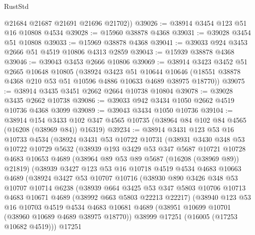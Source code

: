\begin{lexlean}{RustStd}
\begin{coremodule}
        @21684
        @21687
        @21691
        @21696
        @21702))
@39026 := @38914 @3454 @123 @51 @16 @10808 @4534
@39028 := @15960 @38878 @4368
@39031 := @39028 @3454 @51 @10808
@39033 := @15969 @38878 @4368
@39041 := @39033 @924 @3453 @2666 @51 @4519 @10806 @4313 @2859
@39043 := @15939 @38878 @4368
@39046 := @39043 @3453 @2666 @10806
@39069 := @38914
    @3423
    @3452
    @51
    @2665
    @10648
    @10805
    (@38924
      @3423
      @51
      @10644
      @10646
      (@18551 @38878 @4368 @210 @53 @51 @10596 @4886 @10633 @4689 @38975 @18770))
@39075 := @38914 @3435 @3451 @2662 @2664 @10738 @10804
@39078 := @39028 @3435 @2662 @10738
@39086 := @39033 @942 @3434 @1050 @2662 @4519 @10736 @4368 @3099
@39089 := @39043 @3434 @1050 @10736
@39104 := @38914
    @154
    @3433
    @102
    @347
    @4565
    @10735
    (@38964 @84 @102 @84 @4565 (@16208 (@38969 @84)) @16319)
@39234 := @38914
    @3431
    @123
    @53
    @16
    @10733
    @4534
    (@38924
      @3431
      @53
      @10722
      @10731
      (@38931
        @3430
        @348
        @53
        @10722
        @10729
        @5632
        (@38939
          @193
          @3429
          @53
          @347
          @5687
          @10721
          @10728
          @4683
          @10653
          @4689
          (@38964 @89 @53 @89 @5687 (@16208 (@38969 @89)) @21819)
          (@38939
            @3427
            @123
            @53
            @16
            @10718
            @4519
            @4534
            @4683
            @10663
            @4689
            (@38924
              @3427
              @53
              @10707
              @10716
              (@38930
                @890
                @3426
                @348
                @53
                @10707
                @10714
                @6238
                (@38939
                  @664
                  @3425
                  @53
                  @347
                  @5803
                  @10706
                  @10713
                  @4683
                  @10671
                  @4689
                  (@38992 @663 @5803 @22213 @22217)
                  (@38940
                    @123
                    @53
                    @16
                    @10703
                    @4519
                    @4534
                    @4683
                    @10681
                    @4689
                    (@38951 @10699 @10701 (@38960 @10689 @4689 @38975 @18770))
                    @38999
                    @17251
                    (@16005 (@17253 @10682 @4519)))
                  @17251

\end{coremodule}
\end{lexlean}
